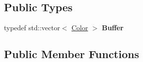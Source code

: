 \subsection*{Public Types}
\begin{DoxyCompactItemize}
\item 
\mbox{\label{classprzurro_1_1_color___buffer___rgb565_a7715c0847adf6b626c5c6a09903bfe80}} 
typedef std\+::vector$<$ \mbox{\hyperlink{structprzurro_1_1_color___buffer___rgb565_1_1_color}{Color}} $>$ {\bfseries Buffer}
\end{DoxyCompactItemize}
\subsection*{Public Member Functions}
